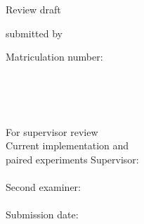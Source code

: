 \begin{titlepage}
  \singlespacing
  \begin{center}
    \vspace*{4.5cm}
    {\huge\bfseries\sffamily \ThesisTitle\par}

    \vspace{1.5cm}
    {\Large \ThesisType\par}

    \vspace{1.5cm}
    \ifReviewDraft
    {\Large \ThesisAuthor\par}
    \bigskip
    {\Large Review draft\par}
    \medskip
    {\large \ReviewDraftDate\par}
    \else
    {\large submitted by\par}
    \bigskip
    {\Large \ThesisAuthor\par}
    \medskip
    {\large Matriculation number: \MatriculationNumber\par}
    \fi
  \end{center}

  \vfill
  \noindent
  \begin{minipage}[b]{0.53\textwidth}
    \UniversityName\\
    \DepartmentName\\
    \InstituteName\\
    \ResearchGroupName
  \end{minipage}
  \hfill
  \begin{minipage}[b]{0.42\textwidth}
    \raggedleft
    \ifReviewDraft
    For supervisor review\\[0.75em]
    Current implementation and\\
    paired experiments
    \else
    Supervisor:\\
    \ThesisSupervisor\\[0.75em]
    Second examiner:\\
    \SecondExaminer\\[0.75em]
    Submission date:\\
    \SubmissionDate
    \fi
  \end{minipage}
\end{titlepage}
\restoregeometry
